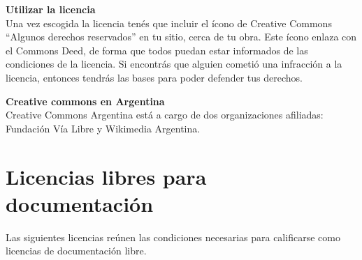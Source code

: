 {\bf Utilizar la licencia}\\

Una vez escogida la licencia tenés que incluir el ícono de Creative Commons “Algunos derechos reservados” en tu sitio, cerca de tu obra. Este ícono enlaza con el Commons Deed, de forma que todos puedan estar informados de las condiciones de la licencia. Si encontrás que alguien cometió una infracción a la licencia, entonces tendrás las bases para poder defender tus derechos.

{\bf Creative commons en Argentina}\\

Creative Commons Argentina está a cargo de dos organizaciones afiliadas: Fundación Vía Libre y Wikimedia Argentina.

\section{Licencias libres para documentación}

Las siguientes licencias reúnen las condiciones necesarias para calificarse como licencias de documentación libre.

